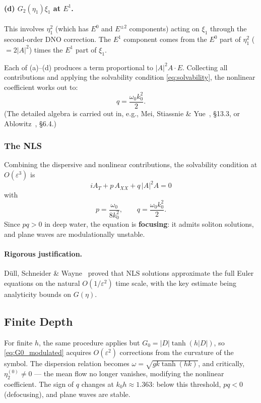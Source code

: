 \documentclass[11pt]{article}
\newcommand{\eps}{\varepsilon}
\begin{document}
\paragraph{(d) $G_2(\eta_1)\xi_1$ at $E^1$.}
This involves $\eta_1^2$ (which has $E^0$ and $E^{\pm 2}$ components)
acting on $\xi_1$ through the second-order DNO correction.
The $E^1$ component comes from the $E^0$ part of $\eta_1^2$ ($= 2|A|^2$)
times the $E^1$ part of $\xi_1$.

\medskip

Each of (a)--(d) produces a term proportional to $|A|^2 A\cdot E$.
Collecting all contributions and applying the solvability condition
\eqref{eq:solvability}, the nonlinear coefficient works out to:
\begin{equation}
q = \frac{\omega_0 k_0^2}{2}.
\label{eq:q}
\end{equation}
(The detailed algebra is carried out in, e.g.,
Mei, Stiassnie \& Yue~\cite{mei2005}, \S13.3,
or Ablowitz~\cite{ablowitz2011}, \S6.4.)

\subsubsection{The NLS}

Combining the dispersive and nonlinear contributions, the
solvability condition at $O(\eps^3)$ is
\begin{equation}
\boxed{
iA_T + p\,A_{XX} + q\,|A|^2 A = 0
}
\label{eq:nls}
\end{equation}
with
\[
p = \frac{\omega_0}{8k_0^2}, \qquad
q = \frac{\omega_0 k_0^2}{2}.
\]
Since $pq > 0$ in deep water, the equation is \textbf{focusing}:
it admits soliton solutions, and plane waves are modulationally unstable.

\paragraph{Rigorous justification.}
D\"ull, Schneider \& Wayne~\cite{dull2015} proved that NLS solutions
approximate the full Euler equations on the natural $O(1/\eps^2)$ time scale,
with the key estimate being analyticity bounds on $G(\eta)$.

\subsection{Finite Depth}

For finite $h$, the same procedure applies but $G_0 = |D|\tanh(h|D|)$,
so \eqref{eq:G0_modulated} acquires $O(\eps^2)$ corrections from the
curvature of the symbol.
The dispersion relation becomes $\omega = \sqrt{gk\tanh(hk)}$,
and critically, $\eta_2^{(0)} \neq 0$ --- the mean flow no longer vanishes,
modifying the nonlinear coefficient.
The sign of $q$ changes at $k_0 h \approx 1.363$: below this threshold,
$pq < 0$ (defocusing), and plane waves are stable.
\end{document}
